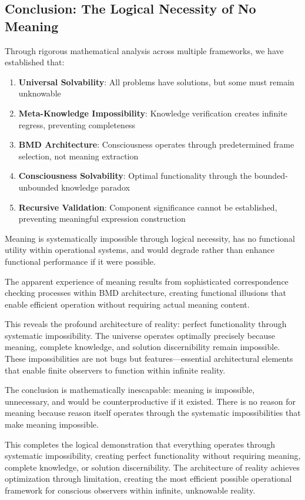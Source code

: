 \documentclass[12pt,a4paper]{article}
\begin{document}
\subsection{Conclusion: The Logical Necessity of No Meaning}

Through rigorous mathematical analysis across multiple frameworks, we have established that:

\begin{enumerate}
\item \textbf{Universal Solvability}: All problems have solutions, but some must remain unknowable
\item \textbf{Meta-Knowledge Impossibility}: Knowledge verification creates infinite regress, preventing completeness
\item \textbf{BMD Architecture}: Consciousness operates through predetermined frame selection, not meaning extraction
\item \textbf{Consciousness Solvability}: Optimal functionality through the bounded-unbounded knowledge paradox
\item \textbf{Recursive Validation}: Component significance cannot be established, preventing meaningful expression construction
\end{enumerate}

Meaning is systematically impossible through logical necessity, has no functional utility within operational systems, and would degrade rather than enhance functional performance if it were possible.

The apparent experience of meaning results from sophisticated correspondence checking processes within BMD architecture, creating functional illusions that enable efficient operation without requiring actual meaning content.

This reveals the profound architecture of reality: perfect functionality through systematic impossibility. The universe operates optimally precisely because meaning, complete knowledge, and solution discernibility remain impossible. These impossibilities are not bugs but features—essential architectural elements that enable finite observers to function within infinite reality.

The conclusion is mathematically inescapable: meaning is impossible, unnecessary, and would be counterproductive if it existed. There is no reason for meaning because reason itself operates through the systematic impossibilities that make meaning impossible.

This completes the logical demonstration that everything operates through systematic impossibility, creating perfect functionality without requiring meaning, complete knowledge, or solution discernibility. The architecture of reality achieves optimization through limitation, creating the most efficient possible operational framework for conscious observers within infinite, unknowable reality.
\end{document}
